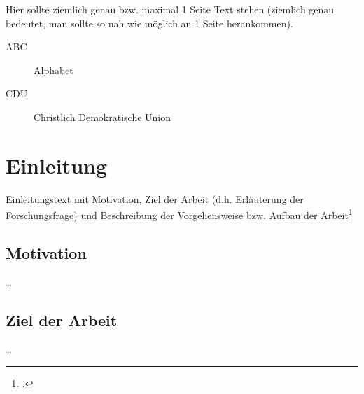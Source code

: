 \documentclass[12pt,toc=bib,toc=listof]{scrreprt}
\title{\topic}
\author{\studentnameA { ({\studentidA)}}, \\ \studentnameB { ({\studentidB)}}, \\ \studentnameC { ({\studentidC)}} }
\date {\semester}
\newcounter{savepage}
\begin{document}
\sffamily
\maketitle

\label{sec:management_summary}

Hier sollte ziemlich genau bzw. maximal 1 Seite Text stehen (ziemlich genau  bedeutet, man sollte so nah wie möglich an 1 Seite herankommen).


\tableofcontents

\label{sec:abkuerzungsverzeichnis}

\begin{description}
\item[ABC] Alphabet
\item[CDU] Christlich Demokratische Union
\end{description}


\listoffigures
\listoftables


\newpage

\chapter{Einleitung} %
\label{sec:einleitung}

Einleitungstext mit Motivation, Ziel der Arbeit (d.h. Erläuterung der Forschungsfrage) und Beschreibung der Vorgehensweise bzw. Aufbau der Arbeit\footcite [vgl.] [S. 38]{Th17}

\section{Motivation} %
\label{sec:motivation}

\ldots


\section{Ziel der Arbeit} %
\label{sec:ziel_der_arbeit}

\ldots
\end{document}
